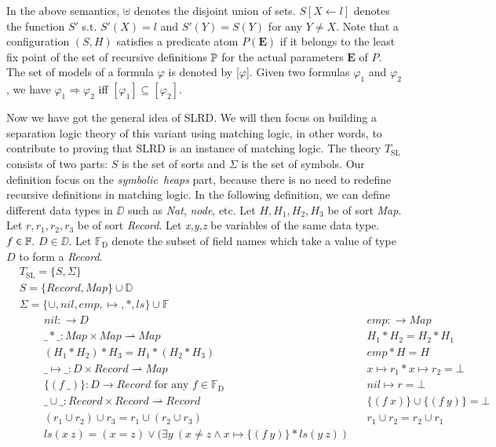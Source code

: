 \documentclass{article}
\theoremstyle{plain}
\begin{document}
In the above semantics, $\uplus$ denotes the disjoint union of sets. 
$ S[X\gets\mathit{l}]$ denotes the function $S'$ s.t. $S'(X) = l$ and $S'(Y)=S(Y)$ for any $Y \ne X$. 
Note that a configuration $(S,H)$ satisfies a predicate atom $P(\mathbf{E})$ if it belongs to the least fix point of the set of recursive definitions $\mathbb{P}$ for the actual parameters $\mathbf{E}$ of $P$. The set of models of a formula $\varphi$ is denoted by [$\varphi$]. Given two formulas $\varphi_1$ and $\varphi_2$, we have $\varphi_1 \Rightarrow \varphi_2$ iff $[\varphi_1] \subseteq [\varphi_2]$.

Now we have got the general idea of SLRD. 
We will then focus on building a separation logic theory of this variant using matching logic, in other words, to contribute to proving that SLRD is an instance of matching logic. 
The theory $T_{\mathrm{SL}}$ consists of two parts: $S$ is the set of sorts and $\Sigma$ is the set of symbols. 
Our definition focus on the \textit{symbolic\ heaps} part, because there is no need to redefine recursive definitions in matching logic. 
In the following definition, we can define different data types in $\DD$ such as \textit{Nat}, \textit{node}, etc. 
Let $\mathit{H,H_1,H_2,H_3}$ be of sort \textit{Map}. Let $\mathit{r,r_1,r_2,r_3}$ be of sort \textit{Record}. 
Let \textit{x,y,z} be variables of the same data type.  $f\in\mathbb{F}$. $D\in\DD$. Let $\mathbb{F_\mathrm{D}}$ denote the subset of field names which take a value of type $D$ to form a \textit{Record}.
\begin{align*}
&T_{\mathrm{SL}} =  \{ S , \Sigma \}\\
& S =  \{ \mathit{Record} , \mathit{Map} \} \cup  \mathbb{D }\\
&\Sigma = \{\cup , \mathit{nil} , \mathit{emp} , \mapsto ,  \mathit{*} , \mathit{ls}\}\cup  \mathbb{F }\\
&\qquad\ nil:\to\mathit{D} & &\mathit{emp}:\to \mathit{Map} \\ 
&\qquad\ \_*\_:\mathit{Map}\times\mathit{Map}\rightharpoonup Map& &\mathit{H_1 * H_2 = H_2 * H_1}\\
&\qquad\ (H_1 * H_2) * H_3 = H_1 * (H_2 * H_3)& & \mathit{emp}*\mathit{H}=\mathit{H}\\
&\qquad\ \_ \mapsto \_ :D\times Record \rightharpoonup Map& & x \mapsto r_1 * x \mapsto r_2 = \bot\\
&\qquad\ \{(f\ \_)\}:\mathit{D} \to \mathit{Record}\text{\ \ for any }f\in\mathbb{F_\mathrm{D}} & &nil \mapsto r = \bot
\\
&\qquad\ \_\cup\_:\mathit{Record}\times\mathit{Record}\rightharpoonup\mathit{Record}& &\{(f\ x)\}\cup\{(f\ y)\} = \bot\\
&\qquad\ (r_1 \cup r_2) \cup r_3 = r_1 \cup (r_2 \cup r_3)& &r_1 \cup r_2 = r_2 \cup r_1
\\&\qquad\ \mathit{ls} (x\ z) = (x = z)\vee ( \exists y\ (x \ne z \wedge x \mapsto \{( f\ y)\} *\mathit{ls} (y\ z))
\end{align*}
\end{document}
